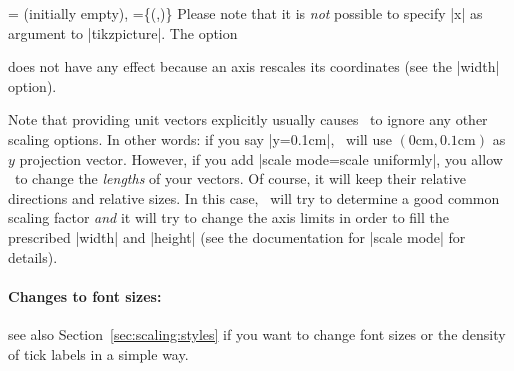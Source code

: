 \begin{pgfplotsxykeylist}{
	\x= (initially empty),
	\x={\{(,)\}}}
	Please note that it is \emph{not} possible to specify |x| as argument to |tikzpicture|. The option 
\begin{codeexample}
\end{codeexample}
	does not have any effect because an axis rescales its coordinates (see the |width| option).

	Note that providing unit vectors explicitly usually causes \PGFPlots\ to ignore any other scaling options. In other words: if you say |y=0.1cm|, \PGFPlots\ will use $(0\text{cm},0.1\text{cm})$ as $y$ projection vector. However, if you add |scale mode=scale uniformly|, you allow \PGFPlots\ to change the \emph{lengths} of your vectors. Of course, it will keep their relative directions and relative sizes. In this case, \PGFPlots\ will try to determine a good common scaling factor \emph{and} it will try to change the axis limits in order to fill the prescribed |width| and |height| (see the documentation for |scale mode| for details).
\begin{codeexample}[]
\end{codeexample}

\paragraph{Changes to font sizes:} see also Section~\ref{sec:scaling:styles} if you want to change font sizes or the density of tick labels in a simple way.


\end{pgfplotsxykeylist}
